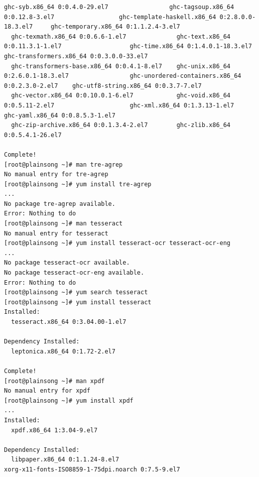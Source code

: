 \documentclass[10pt]{article}
\begin{document}
\begin{Verbatim}[fontsize=\scriptsize]
  ghc-syb.x86_64 0:0.4.0-29.el7                 ghc-tagsoup.x86_64 0:0.12.8-3.el7                  ghc-template-haskell.x86_64 0:2.8.0.0-18.3.el7     ghc-temporary.x86_64 0:1.1.2.4-3.el7                
  ghc-texmath.x86_64 0:0.6.6-1.el7              ghc-text.x86_64 0:0.11.3.1-1.el7                   ghc-time.x86_64 0:1.4.0.1-18.3.el7                 ghc-transformers.x86_64 0:0.3.0.0-33.el7            
  ghc-transformers-base.x86_64 0:0.4.1-8.el7    ghc-unix.x86_64 0:2.6.0.1-18.3.el7                 ghc-unordered-containers.x86_64 0:0.2.3.0-2.el7    ghc-utf8-string.x86_64 0:0.3.7-7.el7                
  ghc-vector.x86_64 0:0.10.0.1-6.el7            ghc-void.x86_64 0:0.5.11-2.el7                     ghc-xml.x86_64 0:1.3.13-1.el7                      ghc-yaml.x86_64 0:0.8.5.3-1.el7                     
  ghc-zip-archive.x86_64 0:0.1.3.4-2.el7        ghc-zlib.x86_64 0:0.5.4.1-26.el7                  

Complete!
[root@plainsong ~]# man tre-agrep
No manual entry for tre-agrep
[root@plainsong ~]# yum install tre-agrep
...
No package tre-agrep available.
Error: Nothing to do
[root@plainsong ~]# man tesseract
No manual entry for tesseract
[root@plainsong ~]# yum install tesseract-ocr tesseract-ocr-eng
...
No package tesseract-ocr available.
No package tesseract-ocr-eng available.
Error: Nothing to do
[root@plainsong ~]# yum search tesseract
[root@plainsong ~]# yum install tesseract
Installed:
  tesseract.x86_64 0:3.04.00-1.el7                                                                                                                                                                          

Dependency Installed:
  leptonica.x86_64 0:1.72-2.el7                                                                                                                                                                             

Complete!
[root@plainsong ~]# man xpdf
No manual entry for xpdf
[root@plainsong ~]# yum install xpdf
...
Installed:
  xpdf.x86_64 1:3.04-9.el7                                                                                                                                                                                  

Dependency Installed:
  libpaper.x86_64 0:1.1.24-8.el7                                                              xorg-x11-fonts-ISO8859-1-75dpi.noarch 0:7.5-9.el7                                                             


\end{Verbatim}
\end{document}
